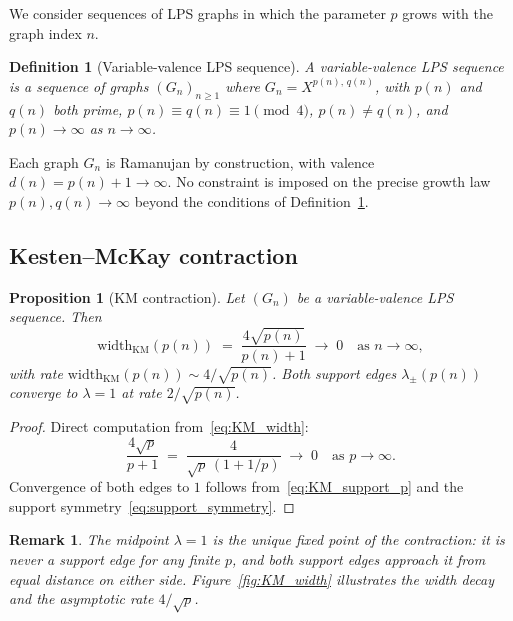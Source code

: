 \documentclass[11pt]{article}
\newtheorem{proposition}[theorem]{Proposition}
\newtheorem{definition}[theorem]{Definition}
\newtheorem{remark}[theorem]{Remark}
\newcommand{\widthKM}{\mathrm{width}_{\mathrm{KM}}}
\begin{document}
    We consider sequences of LPS graphs in which the parameter $p$ grows with
    the graph index $n$.

    \begin{definition}[Variable-valence LPS sequence]
      \label{def:vv_sequence}
      A \emph{variable-valence LPS sequence} is a sequence of graphs
      $(G_n)_{n \geq 1}$ where $G_n = X^{p(n),\,q(n)}$, with $p(n)$ and $q(n)$
      both prime, $p(n) \equiv q(n) \equiv 1 \pmod{4}$, $p(n) \neq q(n)$, and
      $p(n) \to \infty$ as $n \to \infty$.
    \end{definition}

    Each graph $G_n$ is Ramanujan by construction, with valence
    $d(n) = p(n) + 1 \to \infty$.
    No constraint is imposed on the precise growth law $p(n), q(n) \to \infty$
    beyond the conditions of Definition~\ref{def:vv_sequence}.

  \subsection{Kesten--McKay contraction}
    \label{subsec:KM_contraction}

    \begin{proposition}[KM contraction]
      \label{prop:KM_contraction}
      Let $(G_n)$ be a variable-valence LPS sequence.
      Then
      \begin{equation}
        \widthKM(p(n)) \;=\; \frac{4\sqrt{p(n)}}{p(n)+1}
        \;\longrightarrow\; 0 \quad \text{as } n \to \infty,
        \label{eq:KM_contraction}
      \end{equation}
      with rate $\widthKM(p(n)) \sim 4/\sqrt{p(n)}$.
      Both support edges $\lambda_\pm(p(n))$ converge to $\lambda = 1$ at rate
      $2/\sqrt{p(n)}$.
    \end{proposition}

    \begin{proof}
      Direct computation from~\eqref{eq:KM_width}:
      \[
        \frac{4\sqrt{p}}{p+1} \;=\; \frac{4}{\sqrt{p}\,(1 + 1/p)}
        \;\longrightarrow\; 0 \quad \text{as } p \to \infty.
      \]
      Convergence of both edges to $1$ follows from~\eqref{eq:KM_support_p}
      and the support symmetry~\eqref{eq:support_symmetry}.
    \end{proof}

    \begin{remark}
      The midpoint $\lambda = 1$ is the unique fixed point of the contraction:
      it is never a support edge for any finite $p$, and both support edges
      approach it from equal distance on either side.
      Figure~\ref{fig:KM_width} illustrates the width decay and the asymptotic
      rate $4/\sqrt{p}$.
    \end{remark}
\end{document}
